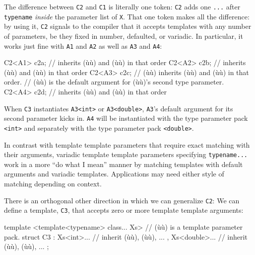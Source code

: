 The difference between \lstinline!C2! and \lstinline!C1! is literally one
token: \lstinline!C2! adds one \lstinline!...! after \lstinline!typename!
\emph{inside} the parameter list of \lstinline!X!. That one token makes all
the difference: by using it, \lstinline!C2! signals to the compiler that it
accepts templates with any number of parameters, be they fixed in
number, defaulted, or variadic. In particular, it works just fine with
\lstinline!A1! and \lstinline!A2! as well as \lstinline!A3! and \lstinline!A4!:

\begin{emcppslisting}[emcppsbatch=e24]
C2<A1> c2a;
    // inherits (ù{}ù) and (ù{}ù) in that order
C2<A2> c2b;
    // inherits (ù{}ù) and (ù{}ù) in that order
C2<A3> c2c;
    // (ù{}ù) inherits (ù{}ù) and (ù{}ù) in that order.
    // (ù{}ù) is the default argument for (ù{}ù)'s second type parameter.
C2<A4> c2d;
    // inherits (ù{}ù) and (ù{}ù) in that order
\end{emcppslisting}
    

\noindent When \lstinline!C3! instantiates \lstinline!A3<int>! or \lstinline!A3<double>!,
\lstinline!A3!'s default argument for its second parameter kicks in.
\lstinline!A4! will be instantiated with the type parameter pack
\lstinline!<int>! and separately with the type parameter pack
\lstinline!<double>!.

In contrast with template template parameters that require exact
matching with their arguments, variadic template template parameters
specifying \lstinline!typename...! work in a more ``do what I mean'' manner
by matching templates with default arguments and variadic templates.
Applications may need either style of matching depending on context.

There is an orthogonal other direction in which we can generalize
\lstinline!C2!: We can define a template, \lstinline!C3!, that accepts zero or
more template template arguments:

\begin{emcppslisting}[emcppsbatch=e24]
template <template<typename> class... Xs>  // (ù{}ù) is a template parameter pack.
struct C3
    : Xs<int>...     // inherit (ù{}ù), (ù{}ù), ...
    , Xs<double>...  // inherit (ù{}ù), (ù{}ù), ...
{ };
\end{emcppslisting}
    

